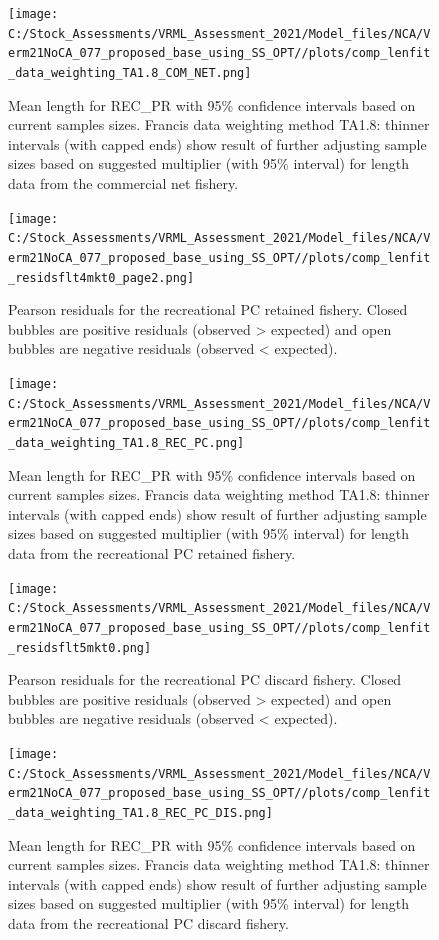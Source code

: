 \documentclass[
  english,
  a4paper,
]{article}
\begin{document}
\begin{figure}
\centering
\texttt{[image: C:/Stock\_Assessments/VRML\_Assessment\_2021/Model\_files/NCA/Verm21NoCA\_077\_proposed\_base\_using\_SS\_OPT//plots/comp\_lenfit\_data\_weighting\_TA1.8\_COM\_NET.png]}
\caption{Mean length for REC\_PR with 95\% confidence intervals based on current samples sizes. Francis data weighting method TA1.8: thinner intervals (with capped ends) show result of further adjusting sample sizes based on suggested multiplier (with 95\% interval) for length data from the commercial net fishery.\label{fig:mean-len-fit-COM-NET}}
\end{figure}

\begin{figure}
\centering
\texttt{[image: C:/Stock\_Assessments/VRML\_Assessment\_2021/Model\_files/NCA/Verm21NoCA\_077\_proposed\_base\_using\_SS\_OPT//plots/comp\_lenfit\_residsflt4mkt0\_page2.png]}
\caption{Pearson residuals for the recreational PC retained fishery. Closed bubbles are positive residuals (observed \textgreater{} expected) and open bubbles are negative residuals (observed \textless{} expected).\label{fig:len-pearson-REC-PC}}
\end{figure}

\begin{figure}
\centering
\texttt{[image: C:/Stock\_Assessments/VRML\_Assessment\_2021/Model\_files/NCA/Verm21NoCA\_077\_proposed\_base\_using\_SS\_OPT//plots/comp\_lenfit\_data\_weighting\_TA1.8\_REC\_PC.png]}
\caption{Mean length for REC\_PR with 95\% confidence intervals based on current samples sizes. Francis data weighting method TA1.8: thinner intervals (with capped ends) show result of further adjusting sample sizes based on suggested multiplier (with 95\% interval) for length data from the recreational PC retained fishery.\label{fig:mean-len-fit-REC-PC}}
\end{figure}

\begin{figure}
\centering
\texttt{[image: C:/Stock\_Assessments/VRML\_Assessment\_2021/Model\_files/NCA/Verm21NoCA\_077\_proposed\_base\_using\_SS\_OPT//plots/comp\_lenfit\_residsflt5mkt0.png]}
\caption{Pearson residuals for the recreational PC discard fishery. Closed bubbles are positive residuals (observed \textgreater{} expected) and open bubbles are negative residuals (observed \textless{} expected).\label{fig:len-pearson-REC-PC-DIS}}
\end{figure}

\begin{figure}
\centering
\texttt{[image: C:/Stock\_Assessments/VRML\_Assessment\_2021/Model\_files/NCA/Verm21NoCA\_077\_proposed\_base\_using\_SS\_OPT//plots/comp\_lenfit\_data\_weighting\_TA1.8\_REC\_PC\_DIS.png]}
\caption{Mean length for REC\_PR with 95\% confidence intervals based on current samples sizes. Francis data weighting method TA1.8: thinner intervals (with capped ends) show result of further adjusting sample sizes based on suggested multiplier (with 95\% interval) for length data from the recreational PC discard fishery.\label{fig:mean-len-fit-REC-PC-DIS}}
\end{figure}
\end{document}

